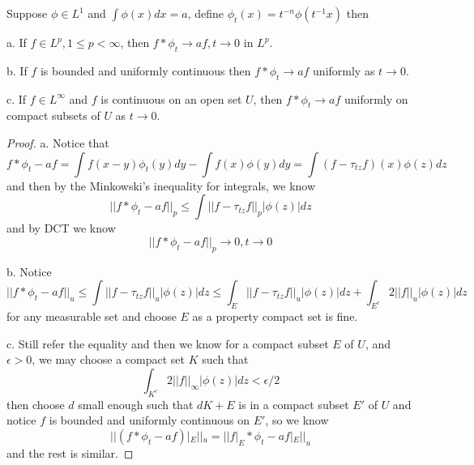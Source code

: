 \documentclass[lang=en, color=blue, ]{elegantbook}
\begin{document}
\begin{theorem}
    Suppose $\phi\in L^1$ and $\int \phi(x)dx = a$, define $\phi_t(x) = t^{-n}\phi(t^{-1}x)$ then\par
    a. If $f\in L^p, 1\leq p < \infty$, then $f* \phi_t \to af,t\to 0$ in $L^p$.\par
    b. If $f$ is bounded and uniformly continuous then $f*\phi_t \to af$ uniformly as $t\to 0$.\par
    c. If $f\in L^{\infty}$ and $f$ is continuous on an open set $U$, then $f*\phi_t \to af$ uniformly on compact subsets of $U$ as $t\to 0$.
\end{theorem}
\begin{proof}\par
    a. Notice that
    \[
    f*\phi_t - af = \int f(x-y)\phi_t(y) dy- \int f(x)\phi(y)dy = \int(f-\tau_{tz}f)(x)\phi(z)dz
    \]
    and then by the Minkowski's inequality for integrals, we know
    \[
    ||f*\phi_t-af||_p \leq \int ||f-\tau_{tz}f||_p |\phi(z)| dz
    \]
    and by DCT we know
    \[
    ||f*\phi_t-af||_p \to 0, t\to 0
    \]\par
    b. Notice
    \[
    ||f*\phi_t - af||_u \leq \int ||f-\tau_{tz}f||_u|\phi(z)|dz \leq \int_E ||f-\tau_{tz}f||_u|\phi(z)|dz + \int_{E^c}2||f||_u|\phi(z)|dz
    \]
    for any measurable set and choose $E$ as a property compact set is fine.\par
    c. Still refer the equality and then we know for a compact subset $E$ of $U$, and $\epsilon >0$, we may choose a compact set $K$ such that
    \[
    \int_{K^c} 2||f||_{\infty}|\phi(z)|dz < \epsilon/2
    \]
    then choose $d$ small enough such that $dK+E$ is in a compact subset $E'$ of $U$ and notice $f$ is bounded and uniformly continuous on $E'$, so we know
    \[
    ||(f*\phi_t-af)|_{E}||_u = ||f|_E*\phi_t - af|_E||_u
    \]
    and the rest is similar.
\end{proof}
\end{document}
